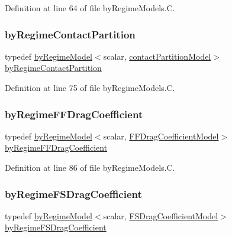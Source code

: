Definition at line 64 of file by\+Regime\+Models.\+C.

\mbox{\label{namespaceFoam_a41017611e326f39a1a0e4469a6091014}} 
\subsubsection{\texorpdfstring{by\+Regime\+Contact\+Partition}{byRegimeContactPartition}}
{\footnotesize\ttfamily typedef \hyperlink{classFoam_1_1byRegimeModel}{by\+Regime\+Model}$<$scalar, \hyperlink{classFoam_1_1contactPartitionModel}{contact\+Partition\+Model}$>$ \hyperlink{namespaceFoam_a41017611e326f39a1a0e4469a6091014}{by\+Regime\+Contact\+Partition}}



Definition at line 75 of file by\+Regime\+Models.\+C.

\mbox{\label{namespaceFoam_af81bf1c46b48683cfa1a97758c9a88ee}} 
\subsubsection{\texorpdfstring{by\+Regime\+F\+F\+Drag\+Coefficient}{byRegimeFFDragCoefficient}}
{\footnotesize\ttfamily typedef \hyperlink{classFoam_1_1byRegimeModel}{by\+Regime\+Model}$<$scalar, \hyperlink{classFoam_1_1FFDragCoefficientModel}{F\+F\+Drag\+Coefficient\+Model}$>$ \hyperlink{namespaceFoam_af81bf1c46b48683cfa1a97758c9a88ee}{by\+Regime\+F\+F\+Drag\+Coefficient}}



Definition at line 86 of file by\+Regime\+Models.\+C.

\mbox{\label{namespaceFoam_a05904e7dc298f47d7b89ab3e56bcf421}} 
\subsubsection{\texorpdfstring{by\+Regime\+F\+S\+Drag\+Coefficient}{byRegimeFSDragCoefficient}}
{\footnotesize\ttfamily typedef \hyperlink{classFoam_1_1byRegimeModel}{by\+Regime\+Model}$<$scalar, \hyperlink{classFoam_1_1FSDragCoefficientModel}{F\+S\+Drag\+Coefficient\+Model}$>$ \hyperlink{namespaceFoam_a05904e7dc298f47d7b89ab3e56bcf421}{by\+Regime\+F\+S\+Drag\+Coefficient}}



